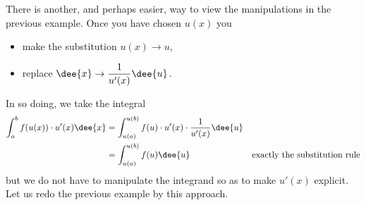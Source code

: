 There is another, and perhaps easier, way to view the manipulations in the previous
example. Once you have chosen $u(x)$ you
\begin{itemize}
 \item make the substitution $u(x) \rightarrow u$,
 \item replace $\dee{x} \rightarrow \dfrac{1}{u'(x)} \dee{u}$.
\end{itemize}
In so doing, we take the integral
\begin{align*}
  \int_a^b f(u(x)) \cdot u'(x) \dee{x}
&= \int_{u(a)}^{u(b)} f(u) \cdot u'(x) \cdot \frac{1}{u'(x)} \dee{u} \\
&= \int_{u(a)}^{u(b)} f(u) \dee{u} & \text{exactly the substitution rule}
\end{align*}
but we do not have to manipulate the integrand so as to make $u'(x)$ explicit.  Let us
redo the previous example by this approach.

